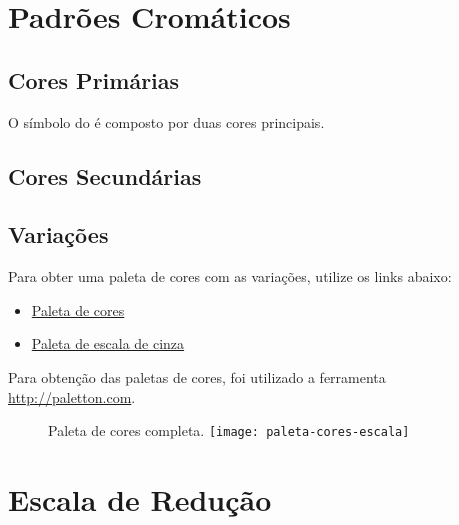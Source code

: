 \documentclass{manualmarca}
\begin{document}
\section{Padrões Cromáticos}
\label{sec:padroes-cromaticos}

\subsection{Cores Primárias}
\label{sec:cores-primarias}

O símbolo do \NExT{} é composto por duas cores principais.

\begin{center}
\end{center}

\subsection{Cores Secundárias}
\label{sec:cores-secundarias}


\subsection{Variações}
\label{sec:variacoes}

Para obter uma paleta de cores com as variações, utilize os links abaixo:

\begin{itemize}
\item \href{http://paletton.com/#uid=7040D0kvjvXojH8rfABuGpcuRk9}{Paleta de cores}
\item \href{http://paletton.com/#uid=1000D0k004M0dcY0dcY5o003H00}{Paleta de escala de cinza}
\end{itemize}

Para obtenção das paletas de cores, foi utilizado a ferramenta \href{http://paletton.com}{http://paletton.com}.

\begin{figure}[!htp]
  \centering
  {Paleta de cores completa.}
  \texttt{[image: paleta-cores-escala]}
\end{figure}

\pagebreak[4]
\section{Escala de Redução}
\label{sec:escala-de-reducao}
\end{document}
